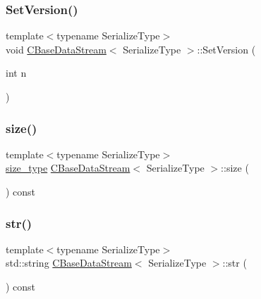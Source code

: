 \mbox{\label{class_c_base_data_stream_a536e45089156e085c0759aaf27aa7c4c}} 
\subsubsection{\texorpdfstring{Set\+Version()}{SetVersion()}}
{\footnotesize\ttfamily template$<$typename Serialize\+Type$>$ \\
void \mbox{\hyperlink{class_c_base_data_stream}{C\+Base\+Data\+Stream}}$<$ Serialize\+Type $>$\+::Set\+Version (\begin{DoxyParamCaption}\item[{int}]{n }\end{DoxyParamCaption})\hspace{0.3cm}{\ttfamily [inline]}}

\mbox{\label{class_c_base_data_stream_aea822d9dff7d0f3e4adb96dba79126a5}} 
\subsubsection{\texorpdfstring{size()}{size()}}
{\footnotesize\ttfamily template$<$typename Serialize\+Type$>$ \\
\mbox{\hyperlink{class_c_base_data_stream_ad042ddea628c43357b9b13be89c71964}{size\+\_\+type}} \mbox{\hyperlink{class_c_base_data_stream}{C\+Base\+Data\+Stream}}$<$ Serialize\+Type $>$\+::size (\begin{DoxyParamCaption}{ }\end{DoxyParamCaption}) const\hspace{0.3cm}{\ttfamily [inline]}}

\mbox{\label{class_c_base_data_stream_ad7e170426e8f8bc2794b2391f27c0fd1}} 
\subsubsection{\texorpdfstring{str()}{str()}}
{\footnotesize\ttfamily template$<$typename Serialize\+Type$>$ \\
std\+::string \mbox{\hyperlink{class_c_base_data_stream}{C\+Base\+Data\+Stream}}$<$ Serialize\+Type $>$\+::str (\begin{DoxyParamCaption}{ }\end{DoxyParamCaption}) const\hspace{0.3cm}{\ttfamily [inline]}}

